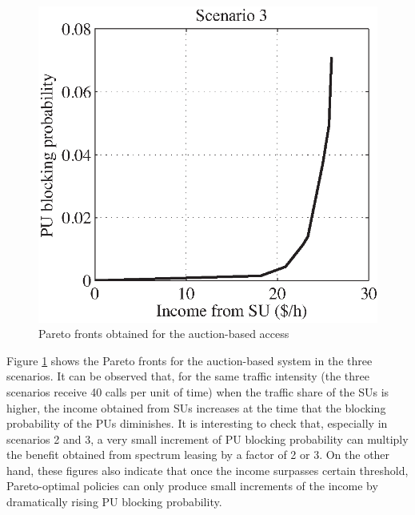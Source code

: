 \begin{figure}
\includegraphics[scale=0.5]{MDPauction1030.eps}
\caption{Pareto fronts obtained for the auction-based access} \label{fig:MDPauction}
\end{figure}

Figure \ref{fig:MDPauction} shows the Pareto fronts for the auction-based system in the three scenarios. It can be observed that, for the same traffic intensity (the three scenarios receive 40 calls per unit of time) when the traffic share of the SUs is higher, the income obtained from SUs increases at the time that the blocking probability of the PUs diminishes. It is interesting to check that, especially in scenarios 2 and 3, a very small increment of PU blocking probability can multiply the benefit obtained from spectrum leasing by a factor of 2 or 3. On the other hand, these figures also indicate that once the income surpasses certain threshold, Pareto-optimal policies can only produce small increments of the income by dramatically rising PU blocking probability.

